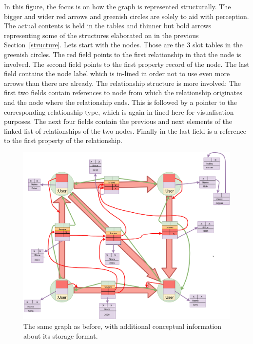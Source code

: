\documentclass[a4paper,10pt]{article}
\begin{document}
    In this figure, the focus is on how the graph is represented structurally. The bigger and wider red arrows and greenish circles are solely to aid with perception. The actual contents is held in the tables and thinner but bold arrows representing some of the structures elaborated on in the previous Section~\ref{structure}.
    Lets start with the nodes.
    Those are the 3 slot tables in the greenish circles.
    The red field points to the first relationship in that the node is involved. 
    The second field points to the first property record of the node. 
    The last field contains the node label which is in-lined in order not to use even more arrows than there are already.
    The relationship structure is more involved: The first two fields contain references to node from which the relationship originates and the node where the relationship ends.
    This is followed by a pointer to the corresponding relationship type, which is again in-lined here for visualisation purposes.
    The next four fields contain the previous and next elements of the linked list of relationships of the two nodes. 
    Finally in the last field is a reference to the first property of the relationship.\\
    \begin{figure}[htp]\label{example_structs}
        \begin{center}
            \includegraphics[keepaspectratio,height=1.2\textheight,width=1.2\textwidth]{img/04_example/example_structs.png}
        \end{center}
        \caption{The same graph as before, with additional conceptual information about its storage format.} %
    \end{figure}
    
\end{document}
